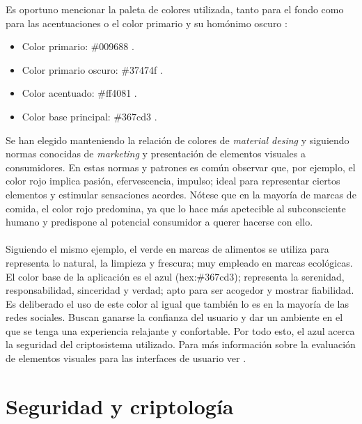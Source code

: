\documentclass[../PFC.tex]{subfiles}
\begin{document}
Es oportuno mencionar la paleta de colores utilizada, tanto para el fondo como para las acentuaciones o el color primario y su homónimo oscuro : 

\begin{itemize}
\item{Color primario: \#009688 .}
\item{Color primario oscuro: \#37474f .}
\item{Color acentuado: \#ff4081 .}
\item{Color base principal: \#367cd3 .}
\end{itemize}

Se han elegido manteniendo la relación de colores de \textit{material desing} y siguiendo normas conocidas de \textit{marketing} y presentación de elementos visuales a consumidores. En estas normas y patrones es común observar que, por ejemplo, el color rojo implica pasión, efervescencia, impulso; ideal para representar ciertos elementos y estimular sensaciones acordes. Nótese que en la mayoría de marcas de comida, el color rojo predomina, ya que lo hace más apetecible al subconsciente humano y predispone al potencial consumidor a querer hacerse con ello. 
\\\\
Siguiendo el mismo ejemplo, el verde en marcas de alimentos se utiliza para representa lo natural, la limpieza y frescura; muy empleado en marcas ecológicas. El color base de la aplicación es el azul (hex:\#367cd3); representa la serenidad, responsabilidad, sinceridad y verdad; apto para ser acogedor y mostrar fiabilidad. Es deliberado el uso de este color al igual que también lo es en la mayoría de las redes sociales. Buscan ganarse la confianza del usuario y dar un ambiente en el que se tenga una experiencia relajante y confortable. Por todo esto, el azul acerca la seguridad del criptosistema utilizado. Para más información sobre la evaluación de elementos visuales para las interfaces de usuario ver \cite{coloresStone}.

\section{Seguridad y criptología}
\label{App:Seguridad y criptología}
\end{document}

